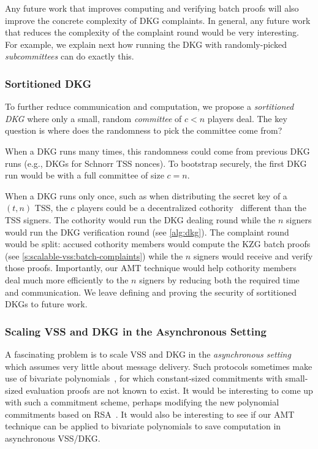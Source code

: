 Any future work that improves computing and verifying batch proofs will also improve the concrete complexity of DKG complaints.
In general, any future work that reduces the complexity of the complaint round would be very interesting.
For example, we explain next how running the DKG with randomly-picked \textit{subcommittees} can do exactly this.

\subsubsection{Sortitioned DKG}
\label{s:future-work:threshcrypto:sortition}
To further reduce communication and computation, we propose a \textit{sortitioned DKG} where only a small, random \textit{committee} of $c < n$ players deal.
The key question is where does the randomness to pick the committee come from?

When a DKG runs many times, this randomness could come from previous DKG runs (e.g., DKGs for Schnorr TSS nonces).
To bootstrap securely, the first DKG run would be with a full committee of size $c=n$.

When a DKG runs only once, such as when distributing the secret key of a $(t,n)$ TSS, the $c$ players could be a decentralized cothority~\cite{STV+16} different than the TSS signers.
The cothority would run the DKG dealing round while the $n$ signers would run the DKG verification round (see \cref{alg:dkg}).
The complaint round would be split: accused cothority members would compute the KZG batch proofs (see \cref{s:scalable-vss:batch-complaints}) while the $n$ signers would receive and verify those proofs.
Importantly, our AMT technique would help cothority members deal much more efficiently to the $n$ signers by reducing both the required time and communication.
We leave defining and proving the security of sortitioned DKGs to future work.

\subsubsection{Scaling VSS and DKG in the Asynchronous Setting}
A fascinating problem is to scale VSS and DKG in the \textit{asynchronous setting} which assumes very little about message delivery.
Such protocols sometimes make use of bivariate polynomials~\cite{Kate2010,KG09,KHG12}, for which constant-sized commitments with small-sized evaluation proofs are not known to exist.
It would be interesting to come up with such a commitment scheme, perhaps modifying the new polynomial commitments based on RSA~\cite{BFS19}.
It would also be interesting to see if our AMT technique can be applied to bivariate polynomials to save computation in asynchronous VSS/DKG.

